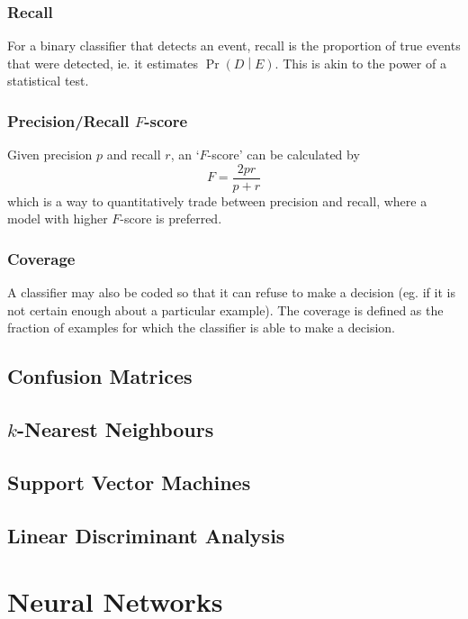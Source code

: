 \documentclass[11pt]{report} %
\begin{document}
\subsubsection{Recall}

For a binary classifier that detects an event, recall is the proportion of true events that were detected, ie. it estimates $\operatorname{Pr}\left(D\middle|E\right)$. This is akin to the power of a statistical test.

\subsubsection{Precision/Recall $F$-score}

Given precision $p$ and recall $r$, an `$F$-score' can be calculated by
\begin{equation}
F = \dfrac{2pr}{p + r}
\end{equation}
which is a way to quantitatively trade between precision and recall, where a model with higher $F$-score is preferred.

\subsubsection{Coverage}

A classifier may also be coded so that it can refuse to make a decision (eg. if it is not certain enough about a particular example). The coverage is defined as the fraction of examples for which the classifier is able to make a decision.

\subsection{Confusion Matrices}

\subsection{$k$-Nearest Neighbours}

\subsection{Support Vector Machines}

\subsection{Linear Discriminant Analysis}

\section{Neural Networks}
\end{document}
